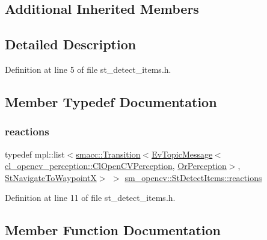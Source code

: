 \subsection*{Additional Inherited Members}


\subsection{Detailed Description}


Definition at line 5 of file st\+\_\+detect\+\_\+items.\+h.



\subsection{Member Typedef Documentation}
\mbox{\label{structsm__opencv_1_1StDetectItems_a46426cacfd99b5b40485b2d68900a4d3}} 
\subsubsection{\texorpdfstring{reactions}{reactions}}
{\footnotesize\ttfamily typedef mpl\+::list$<$\hyperlink{classsmacc_1_1Transition}{smacc\+::\+Transition}$<$\hyperlink{structsmacc_1_1default__events_1_1EvTopicMessage}{Ev\+Topic\+Message}$<$\hyperlink{classsm__opencv_1_1cl__opencv__perception_1_1ClOpenCVPerception}{cl\+\_\+opencv\+\_\+perception\+::\+Cl\+Open\+C\+V\+Perception}, \hyperlink{classsm__opencv_1_1OrPerception}{Or\+Perception}$>$, \hyperlink{structsm__opencv_1_1StNavigateToWaypointX}{St\+Navigate\+To\+WaypointX}$>$ $>$ \hyperlink{structsm__opencv_1_1StDetectItems_a46426cacfd99b5b40485b2d68900a4d3}{sm\+\_\+opencv\+::\+St\+Detect\+Items\+::reactions}}



Definition at line 11 of file st\+\_\+detect\+\_\+items.\+h.



\subsection{Member Function Documentation}
\mbox{\label{structsm__opencv_1_1StDetectItems_a9fc42d2adb3c0cb02300233880af2c6b}} 
